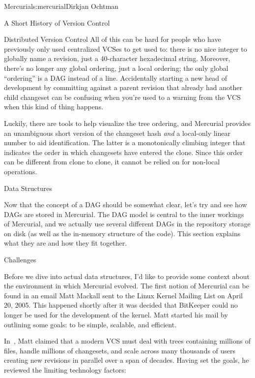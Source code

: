 \begin{aosachapter}{Mercurial}{s:mercurial}{Dirkjan Ochtman}
\begin{aosasect1}{ A Short History of Version Control}
\begin{aosasect2}{Distributed Version Control}
All of this can be hard for people who have previously only used
centralized VCSes to get used to: there is no nice integer to globally
name a revision, just a 40-character hexadecimal string. Moreover,
there's no longer any global ordering, just a local ordering; the only
global ``ordering'' is a DAG instead of a line. Accidentally starting
a new head of development by committing against a parent revision that
already had another child changeset can be confusing when you're used
to a warning from the VCS when this kind of thing happens.

Luckily, there are tools to help visualize the tree ordering, and
Mercurial provides an unambiguous short version of the changeset hash
\emph{and} a local-only linear number to aid identification. The
latter is a monotonically climbing integer that indicates the order in
which changesets have entered the clone. Since this order can be
different from clone to clone, it cannot be relied on for non-local
operations.

\end{aosasect2}

\end{aosasect1}

\begin{aosasect1}{Data Structures}

Now that the concept of a DAG should be somewhat clear, let's try
and see how DAGs are stored in Mercurial. The DAG model is central to
the inner workings of Mercurial, and we actually use several different
DAGs in the repository storage on disk (as well as the in-memory
structure of the code). This section explains what they are and how
they fit together.

\begin{aosasect2}{Challenges}

Before we dive into actual data structures, I'd like to provide some
context about the environment in which Mercurial evolved. The first
notion of Mercurial can be found in an email Matt Mackall sent to the
Linux Kernel Mailing List on April 20, 2005. This happened shortly
after it was decided that BitKeeper could no longer be used for the
development of the kernel. Matt started his mail by outlining some
goals: to be simple, scalable, and efficient.

In~\cite{bib:mackall:better}, Matt claimed that a modern VCS must deal
with trees containing millions of files, handle millions of
changesets, and scale across many thousands of users creating new
revisions in parallel over a span of decades. Having set the goals,
he reviewed the limiting technology factors:


\end{aosasect2}
\end{aosasect1}
\end{aosachapter}
